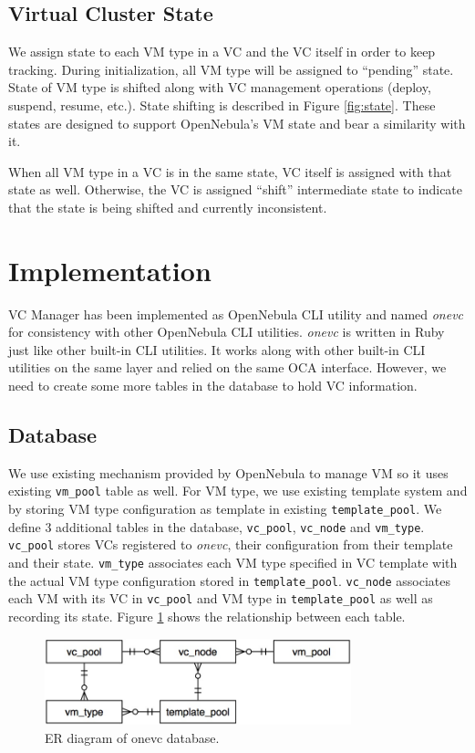 \documentclass[conference]{IEEEtran}
\begin{document}
\subsection{Virtual Cluster State}
We assign state to each VM type in a VC and the VC itself in order to keep tracking.
During initialization, all VM type will be assigned to ``pending'' state.
State of VM type is shifted along with VC management operations (deploy, suspend, resume, etc.).
State shifting is described in Figure \ref{fig:state}.
These states are designed to support OpenNebula's VM state \cite{opennebula-state} and bear a similarity with it.

When all VM type in a VC is in the same state, VC itself is assigned with that state as well.
Otherwise, the VC is assigned ``shift'' intermediate state to indicate that the state is being shifted and currently inconsistent.

\section{Implementation}
VC Manager has been implemented as OpenNebula CLI utility and named \emph{onevc} for consistency with other OpenNebula CLI utilities.
\emph{onevc} is written in Ruby just like other built-in CLI utilities.
It works along with other built-in CLI utilities on the same layer and relied on the same OCA interface.
However, we need to create some more tables in the database to hold VC information.

\subsection{Database}
We use existing mechanism provided by OpenNebula to manage VM so it uses existing \texttt{vm\_pool} table as well.
For VM type, we use existing template system and by storing VM type configuration as template in existing \texttt{template\_pool}.
We define 3 additional tables in the database, \texttt{vc\_pool}, \texttt{vc\_node} and \texttt{vm\_type}.
\texttt{vc\_pool} stores VCs registered to \emph{onevc}, their configuration from their template and their state.
\texttt{vm\_type} associates each VM type specified in VC template with the actual VM type configuration stored in \texttt{template\_pool}.
\texttt{vc\_node} associates each VM with its VC in \texttt{vc\_pool} and VM type in \texttt{template\_pool} as well as recording its state.
Figure \ref{fig:database} shows the relationship between each table.

\begin{figure}[!t]
\centering
\includegraphics[width=3.5in]{database}
\caption{ER diagram of onevc database.}
\label{fig:database}
\end{figure}
\end{document}
